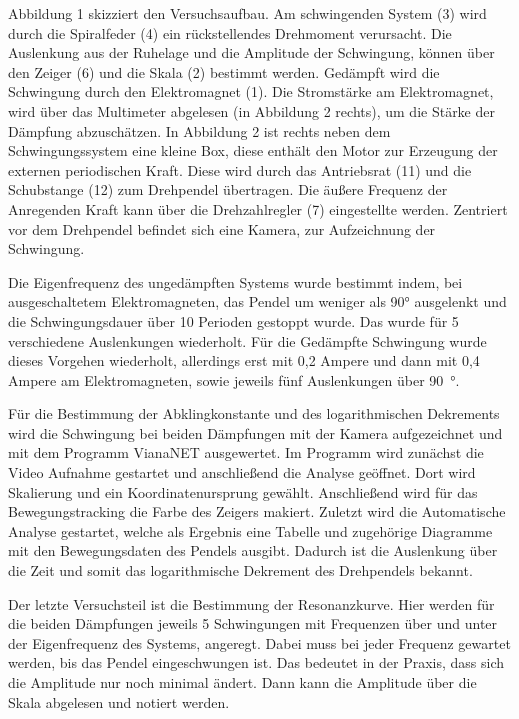\documentclass[
12pt,
a4paper,
bibliography=totocnumbered, %
BCOR=1cm, %
oneside, %
]{scrartcl}
\begin{document}
Abbildung 1 skizziert den Versuchsaufbau. Am schwingenden System (3) wird durch die Spiralfeder (4) ein rückstellendes Drehmoment verursacht. Die Auslenkung aus der Ruhelage und die Amplitude der Schwingung, können über den Zeiger (6) und die Skala (2) bestimmt werden. Gedämpft wird die Schwingung durch den Elektromagnet (1). Die Stromstärke am Elektromagnet, wird über das Multimeter abgelesen (in Abbildung 2 rechts), um die Stärke der Dämpfung abzuschätzen. In Abbildung 2 ist rechts neben dem Schwingungssystem eine kleine Box, diese enthält den Motor zur Erzeugung der externen periodischen Kraft. Diese wird durch das Antriebsrat (11) und die Schubstange (12) zum Drehpendel übertragen. Die äußere Frequenz der Anregenden Kraft kann über die Drehzahlregler (7) eingestellte werden. Zentriert vor dem Drehpendel befindet sich eine Kamera, zur Aufzeichnung der Schwingung.

Die Eigenfrequenz des ungedämpften Systems wurde bestimmt indem, bei ausgeschaltetem Elektromagneten, das Pendel um weniger als 90° ausgelenkt und die Schwingungsdauer über 10 Perioden gestoppt wurde. Das wurde für 5 verschiedene Auslenkungen wiederholt.
Für die Gedämpfte Schwingung wurde dieses Vorgehen wiederholt, allerdings erst mit 0,2 Ampere und dann mit 0,4 Ampere am Elektromagneten, sowie jeweils fünf Auslenkungen über \qty{90}{\degree}.

Für die Bestimmung der Abklingkonstante und des logarithmischen Dekrements wird die Schwingung bei beiden Dämpfungen mit der Kamera aufgezeichnet und mit dem Programm VianaNET ausgewertet. Im Programm wird zunächst die Video Aufnahme gestartet und anschließend die Analyse geöffnet. Dort wird Skalierung und ein Koordinatenursprung gewählt. Anschließend wird für das Bewegungstracking die Farbe des Zeigers makiert. Zuletzt wird die Automatische Analyse gestartet, welche als Ergebnis eine Tabelle und zugehörige Diagramme mit den Bewegungsdaten des Pendels ausgibt. Dadurch ist die Auslenkung über die Zeit und somit das logarithmische Dekrement des Drehpendels bekannt.

Der letzte Versuchsteil ist die Bestimmung der Resonanzkurve. Hier werden für die beiden Dämpfungen jeweils 5 Schwingungen mit Frequenzen über und unter der Eigenfrequenz des Systems, angeregt. Dabei muss bei jeder Frequenz gewartet werden, bis das Pendel eingeschwungen ist. Das bedeutet in der Praxis, dass sich die Amplitude nur noch minimal ändert. Dann kann die Amplitude über die Skala abgelesen und notiert werden.

\end{document}
